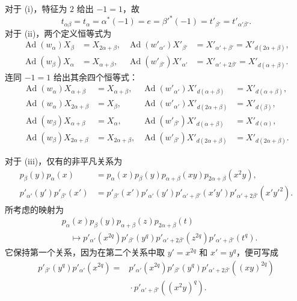对于 (i)，特征为 \(2\) 给出 \(-1=1\)，故
\[
 t_{\alpha\beta}=t_\alpha=\alpha^*(-1)=e
   =\beta'^*(-1)=t'_{\beta'}=t'_{\alpha'\beta'}.
\]
对于 (ii)，两个定义恒等式为
\[
\begin{aligned}
 \operatorname{Ad}(w_\alpha)X_\beta
  &=X_{2\alpha+\beta},&
 \operatorname{Ad}(w'_{\alpha'})X'_{\beta'}
  &=X'_{\alpha'+\beta'}=X'_{d(2\alpha+\beta)},\\
 \operatorname{Ad}(w_\beta)X_\alpha
  &=X_{\alpha+\beta},&
 \operatorname{Ad}(w'_{\beta'})X'_{\alpha'}
  &=X'_{\alpha'+2\beta'}=X'_{d(\alpha+\beta)}.
\end{aligned}
\]
 连同 \(-1=1\) 给出其余四个恒等式：
\[
\begin{aligned}
 \operatorname{Ad}(w_\alpha)X_{\alpha+\beta}&=X_{\alpha+\beta},&
 \operatorname{Ad}(w'_{\alpha'})X'_{d(\alpha+\beta)}
   &=X'_{d(\alpha+\beta)},\\
 \operatorname{Ad}(w_\alpha)X_{2\alpha+\beta}&=X_\beta,&
 \operatorname{Ad}(w'_{\alpha'})X'_{d(2\alpha+\beta)}
   &=X'_{d(\beta)},\\
 \operatorname{Ad}(w_\beta)X_{\alpha+\beta}&=X_\alpha,&
 \operatorname{Ad}(w'_{\beta'})X'_{d(\alpha+\beta)}
   &=X'_{d(\alpha)},\\
 \operatorname{Ad}(w_\beta)X_{2\alpha+\beta}&=X_{2\alpha+\beta},&
 \operatorname{Ad}(w'_{\beta'})X'_{d(2\alpha+\beta)}
   &=X'_{d(2\alpha+\beta)}.
\end{aligned}
\]

对于 (iii)，仅有的非平凡关系为
\[
\begin{aligned}
 p_\beta(y)p_\alpha(x)
  &=p_\alpha(x)p_\beta(y)p_{\alpha+\beta}(xy)
    p_{2\alpha+\beta}(x^2y),\\
 p'_{\alpha'}(y')p'_{\beta'}(x')
  &=p'_{\beta'}(x')p'_{\alpha'}(y')
    p'_{\alpha'+\beta'}(x'y')
    p'_{\alpha'+2\beta'}(x'y'^2).
\end{aligned}
\]
所考虑的映射为
\[
\begin{aligned}
 &p_\alpha(x)p_\beta(y)p_{\alpha+\beta}(z)p_{2\alpha+\beta}(t)\\
 &\quad\longmapsto
 p'_{\alpha'}(x^{2q})p'_{\beta'}(y^q)
 p'_{\alpha'+2\beta'}(z^{2q})p'_{\alpha'+\beta'}(t^q).
\end{aligned}
\]
它保持第一个关系，因为在第二个关系中取 \(y'=x^{2q}\) 和 \(x'=y^q\)，便可写成
\[
\begin{aligned}
 p'_{\beta'}(y^q)p'_{\alpha'}(x^{2q})
  ={}&p'_{\alpha'}(x^{2q})p'_{\beta'}(y^q)
   p'_{\alpha'+2\beta'}((xy)^{2q})\\
   &{}\cdot p'_{\alpha'+\beta'}((x^2y)^q).
\end{aligned}
\]

